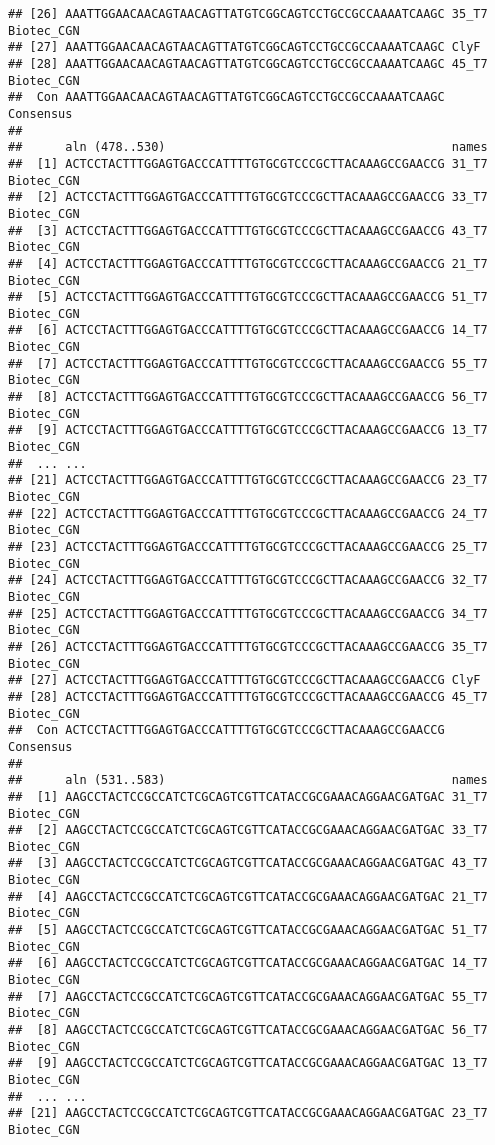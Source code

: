 \documentclass[
]{article}
\begin{document}
\begin{verbatim}
## [26] AAATTGGAACAACAGTAACAGTTATGTCGGCAGTCCTGCCGCCAAAATCAAGC 35_T7 Biotec_CGN
## [27] AAATTGGAACAACAGTAACAGTTATGTCGGCAGTCCTGCCGCCAAAATCAAGC ClyF
## [28] AAATTGGAACAACAGTAACAGTTATGTCGGCAGTCCTGCCGCCAAAATCAAGC 45_T7 Biotec_CGN
##  Con AAATTGGAACAACAGTAACAGTTATGTCGGCAGTCCTGCCGCCAAAATCAAGC Consensus 
## 
##      aln (478..530)                                        names
##  [1] ACTCCTACTTTGGAGTGACCCATTTTGTGCGTCCCGCTTACAAAGCCGAACCG 31_T7 Biotec_CGN
##  [2] ACTCCTACTTTGGAGTGACCCATTTTGTGCGTCCCGCTTACAAAGCCGAACCG 33_T7 Biotec_CGN
##  [3] ACTCCTACTTTGGAGTGACCCATTTTGTGCGTCCCGCTTACAAAGCCGAACCG 43_T7 Biotec_CGN
##  [4] ACTCCTACTTTGGAGTGACCCATTTTGTGCGTCCCGCTTACAAAGCCGAACCG 21_T7 Biotec_CGN
##  [5] ACTCCTACTTTGGAGTGACCCATTTTGTGCGTCCCGCTTACAAAGCCGAACCG 51_T7 Biotec_CGN
##  [6] ACTCCTACTTTGGAGTGACCCATTTTGTGCGTCCCGCTTACAAAGCCGAACCG 14_T7 Biotec_CGN
##  [7] ACTCCTACTTTGGAGTGACCCATTTTGTGCGTCCCGCTTACAAAGCCGAACCG 55_T7 Biotec_CGN
##  [8] ACTCCTACTTTGGAGTGACCCATTTTGTGCGTCCCGCTTACAAAGCCGAACCG 56_T7 Biotec_CGN
##  [9] ACTCCTACTTTGGAGTGACCCATTTTGTGCGTCCCGCTTACAAAGCCGAACCG 13_T7 Biotec_CGN 
##  ... ...
## [21] ACTCCTACTTTGGAGTGACCCATTTTGTGCGTCCCGCTTACAAAGCCGAACCG 23_T7 Biotec_CGN
## [22] ACTCCTACTTTGGAGTGACCCATTTTGTGCGTCCCGCTTACAAAGCCGAACCG 24_T7 Biotec_CGN
## [23] ACTCCTACTTTGGAGTGACCCATTTTGTGCGTCCCGCTTACAAAGCCGAACCG 25_T7 Biotec_CGN
## [24] ACTCCTACTTTGGAGTGACCCATTTTGTGCGTCCCGCTTACAAAGCCGAACCG 32_T7 Biotec_CGN
## [25] ACTCCTACTTTGGAGTGACCCATTTTGTGCGTCCCGCTTACAAAGCCGAACCG 34_T7 Biotec_CGN
## [26] ACTCCTACTTTGGAGTGACCCATTTTGTGCGTCCCGCTTACAAAGCCGAACCG 35_T7 Biotec_CGN
## [27] ACTCCTACTTTGGAGTGACCCATTTTGTGCGTCCCGCTTACAAAGCCGAACCG ClyF
## [28] ACTCCTACTTTGGAGTGACCCATTTTGTGCGTCCCGCTTACAAAGCCGAACCG 45_T7 Biotec_CGN
##  Con ACTCCTACTTTGGAGTGACCCATTTTGTGCGTCCCGCTTACAAAGCCGAACCG Consensus 
## 
##      aln (531..583)                                        names
##  [1] AAGCCTACTCCGCCATCTCGCAGTCGTTCATACCGCGAAACAGGAACGATGAC 31_T7 Biotec_CGN
##  [2] AAGCCTACTCCGCCATCTCGCAGTCGTTCATACCGCGAAACAGGAACGATGAC 33_T7 Biotec_CGN
##  [3] AAGCCTACTCCGCCATCTCGCAGTCGTTCATACCGCGAAACAGGAACGATGAC 43_T7 Biotec_CGN
##  [4] AAGCCTACTCCGCCATCTCGCAGTCGTTCATACCGCGAAACAGGAACGATGAC 21_T7 Biotec_CGN
##  [5] AAGCCTACTCCGCCATCTCGCAGTCGTTCATACCGCGAAACAGGAACGATGAC 51_T7 Biotec_CGN
##  [6] AAGCCTACTCCGCCATCTCGCAGTCGTTCATACCGCGAAACAGGAACGATGAC 14_T7 Biotec_CGN
##  [7] AAGCCTACTCCGCCATCTCGCAGTCGTTCATACCGCGAAACAGGAACGATGAC 55_T7 Biotec_CGN
##  [8] AAGCCTACTCCGCCATCTCGCAGTCGTTCATACCGCGAAACAGGAACGATGAC 56_T7 Biotec_CGN
##  [9] AAGCCTACTCCGCCATCTCGCAGTCGTTCATACCGCGAAACAGGAACGATGAC 13_T7 Biotec_CGN 
##  ... ...
## [21] AAGCCTACTCCGCCATCTCGCAGTCGTTCATACCGCGAAACAGGAACGATGAC 23_T7 Biotec_CGN

\end{verbatim}
\end{document}

